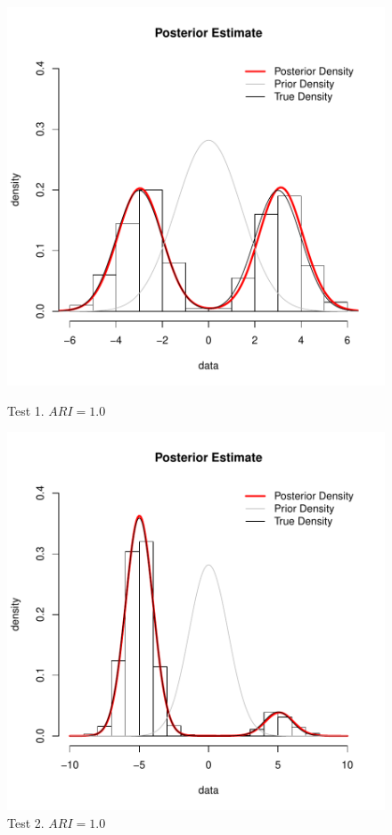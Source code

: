 \begin{figure}[h]
	\centering
	\begin{minipage}{0.5\textwidth}
		\includegraphics[scale=0.4]{etc/test1.pdf}
		\captionsetup{labelformat=empty}
		\caption{Test 1. $ARI = 1.0$}
	\end{minipage}%
	\begin{minipage}{0.5\textwidth}
		\includegraphics[scale=0.4]{etc/test2.pdf}
		\captionsetup{labelformat=empty}
		\caption{Test 2. $ARI = 1.0$}
	\end{minipage}
\end{figure}


